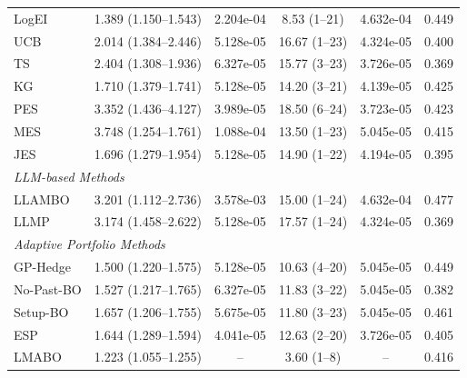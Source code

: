 \begin{table}
\begin{tabular}{@{}lccccc@{}}
LogEI & 1.389 (1.150--1.543) & 2.204e-04 & 8.53 (1--21) & 4.632e-04 & 0.449 \\
UCB & 2.014 (1.384--2.446) & 5.128e-05 & 16.67 (1--23) & 4.324e-05 & 0.400 \\
TS & 2.404 (1.308--1.936) & 6.327e-05 & 15.77 (3--23) & 3.726e-05 & 0.369 \\
KG & 1.710 (1.379--1.741) & 5.128e-05 & 14.20 (3--21) & 4.139e-05 & 0.425 \\
PES & 3.352 (1.436--4.127) & 3.989e-05 & 18.50 (6--24) & 3.723e-05 & 0.423 \\
MES & 3.748 (1.254--1.761) & 1.088e-04 & 13.50 (1--23) & 5.045e-05 & 0.415 \\
JES & 1.696 (1.279--1.954) & 5.128e-05 & 14.90 (1--22) & 4.194e-05 & 0.395 \\
\multicolumn{5}{l}{\textit{LLM-based Methods}} \\
LLAMBO & 3.201 (1.112--2.736) & 3.578e-03 & 15.00 (1--24) & 4.632e-04 & 0.477 \\
LLMP & 3.174 (1.458--2.622) & 5.128e-05 & 17.57 (1--24) & 4.324e-05 & 0.369 \\
\multicolumn{5}{l}{\textit{Adaptive Portfolio Methods}} \\
GP-Hedge & 1.500 (1.220--1.575) & 5.128e-05 & 10.63 (4--20) & 5.045e-05 & 0.449 \\
No-Past-BO & 1.527 (1.217--1.765) & 6.327e-05 & 11.83 (3--22) & 5.045e-05 & 0.382 \\
Setup-BO & 1.657 (1.206--1.755) & 5.675e-05 & 11.80 (3--23) & 5.045e-05 & 0.461 \\
ESP & 1.644 (1.289--1.594) & 4.041e-05 & 12.63 (2--20) & 3.726e-05 & 0.405 \\
\midrule
LMABO & 1.223 (1.055--1.255) & -- & 3.60 (1--8) & -- & 0.416 \\
\bottomrule
    \end{tabular}
    \end{table}
    
